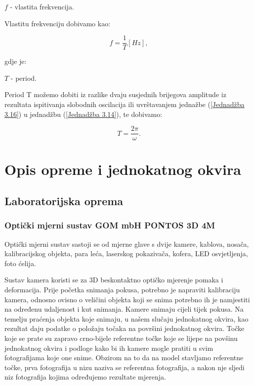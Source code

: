 \documentclass[12pt]{book}
\begin{document}
$f$ - vlastita frekvencija.

Vlastitu frekvenciju dobivamo kao:

\begin{equation}\label{Jednadžba 3.16}
	f = \frac{1}{T} [Hz],
\end{equation}

gdje je:

$T$ - period.

Period T možemo dobiti iz razlike dvaju susjednih brijegova amplitude iz rezultata ispitivanja slobodnih oscilacija ili uvrštavanjem jednažbe (\ref{Jednadžba 3.16}) u jednadžbu (\ref{Jednadžba 3.14}), te dobivamo:

\begin{equation}\label{Jednadžba 3.17}
	T = \frac{2\pi}{\omega}.
\end{equation}



\chapter{Opis opreme i jednokatnog okvira}

\section{Laboratorijska oprema}

\subsection{Optički mjerni sustav GOM mbH PONTOS 3D 4M}

Optički mjerni sustav sastoji se od mjerne glave s dvije kamere, kablova, nosača, kalibracijskog objekta, para leća, laserskog pokazivača, kofera, LED osvjetljenja, foto ćelija.

Sustav kamera koristi se za 3D beskontaktno optičko mjerenje pomaka i deformacija. Prije početka snimanja pokusa, potrebno je napraviti kalibraciju kamera, odnosno ovisno o veličini objekta koji se snima potrebno ih je namjestiti na određenu udaljenost i kut snimanja. Kamere snimaju cijeli tijek pokusa. Na temelju praćenja objekta koje snimaju, u našem slučaju jednokatnog okvira, kao rezultat daju podatke o položaju točaka na površini jednokatnog okvira. Točke koje se prate su zapravo crno-bijele referentne točke koje se lijepe na povšinu jednokatnog okvira i podloge kako bi ih kamere mogle pratiti u svim fotografijama koje one snime. Obzirom na to da na model stavljamo referentne točke, prva fotografija u nizu naziva se referentna fotografija, a nakon nje sljedi niz fotografija kojima određujemo rezultate mjerenja.
\vspace{1cm}
\end{document}
